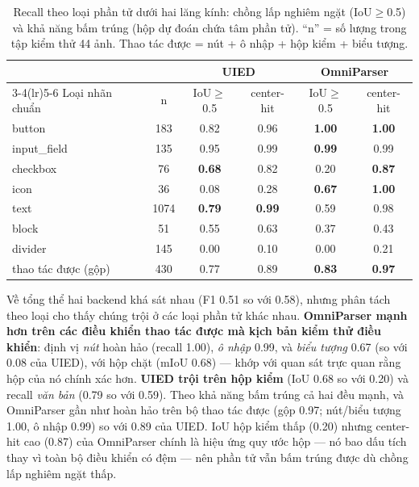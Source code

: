 \documentclass[11pt,a4paper]{article}
\begin{document}
\begin{table}[H]
  \centering
  \caption{Recall theo loại phần tử dưới hai lăng kính: chồng lấp nghiêm ngặt
  (IoU$\geq$0.5) và khả năng bấm trúng (hộp dự đoán chứa tâm phần tử). ``n'' = số
  lượng trong tập kiểm thử 44 ảnh. Thao tác được = nút + ô nhập + hộp kiểm + biểu tượng.}
  \label{tab:pertype}
  \begin{tabular}{lc cc cc}
    \toprule
    & & \multicolumn{2}{c}{UIED} & \multicolumn{2}{c}{OmniParser} \\
    \cmidrule(lr){3-4}\cmidrule(lr){5-6}
    Loại nhãn chuẩn & n & IoU$\geq$0.5 & center-hit & IoU$\geq$0.5 & center-hit \\
    \midrule
    button       & 183  & 0.82 & 0.96 & \textbf{1.00} & \textbf{1.00} \\
    input\_field & 135  & 0.95 & 0.99 & \textbf{0.99} & 0.99 \\
    checkbox     & 76   & \textbf{0.68} & 0.82 & 0.20 & \textbf{0.87} \\
    icon         & 36   & 0.08 & 0.28 & \textbf{0.67} & \textbf{1.00} \\
    text         & 1074 & \textbf{0.79} & \textbf{0.99} & 0.59 & 0.98 \\
    block        & 51   & 0.55 & 0.63 & 0.37 & 0.43 \\
    divider      & 145  & 0.00 & 0.10 & 0.00 & 0.21 \\
    \midrule
    thao tác được (gộp) & 430 & 0.77 & 0.89 & \textbf{0.83} & \textbf{0.97} \\
    \bottomrule
  \end{tabular}
\end{table}

Về tổng thể hai backend khá sát nhau (F1 0.51 so với 0.58), nhưng phân tách theo loại
cho thấy chúng trội ở các loại phần tử khác nhau. \textbf{OmniParser mạnh hơn trên
các điều khiển thao tác được mà kịch bản kiểm thử điều khiển}: định vị \emph{nút} hoàn
hảo (recall 1.00), \emph{ô nhập} 0.99, và \emph{biểu tượng} 0.67 (so với 0.08 của
UIED), với hộp chặt (mIoU 0.68) --- khớp với quan sát trực quan rằng hộp của nó chính
xác hơn. \textbf{UIED trội trên hộp kiểm} (IoU 0.68 so với 0.20) và recall \emph{văn
bản} (0.79 so với 0.59). Theo khả năng bấm trúng cả hai đều mạnh, và OmniParser gần
như hoàn hảo trên bộ thao tác được (gộp 0.97; nút/biểu tượng 1.00, ô nhập 0.99) so với
0.89 của UIED. IoU hộp kiểm thấp (0.20) nhưng center-hit cao (0.87) của OmniParser
chính là hiệu ứng quy ước hộp --- nó bao dấu tích thay vì toàn bộ điều khiển có đệm ---
nên phần tử vẫn bấm trúng được dù chồng lấp nghiêm ngặt thấp.
\end{document}
